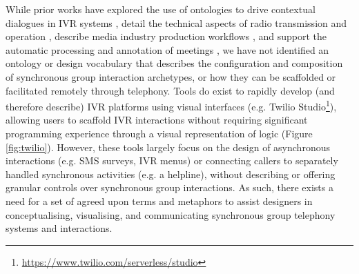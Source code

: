 While prior works have explored the use of ontologies to drive contextual dialogues in IVR systems \cite{ababneh2013, thirumaran2015, thirumaran2015a}, detail the technical aspects of radio transmission and operation \cite{ihmcIHMCOntology}, describe media industry production workflows \cite{movielabs2021}, and support the automatic processing and annotation of meetings \cite{niekrasz2006}, we have not identified an ontology or design vocabulary that describes the configuration and composition of synchronous group interaction archetypes, or how they can be scaffolded or facilitated remotely through telephony. Tools do exist to rapidly develop (and therefore describe) IVR platforms using visual interfaces (e.g. Twilio Studio\footnote{\url{https://www.twilio.com/serverless/studio}}), allowing users to scaffold IVR interactions without requiring significant programming experience through a visual representation of logic (Figure \ref{fig:twilio}). However, these tools largely focus on the design of asynchronous interactions (e.g. SMS surveys, IVR menus) or connecting callers to separately handled synchronous activities (e.g. a helpline), without describing or offering granular controls over synchronous group interactions. As such, there exists a need for a set of agreed upon terms and metaphors to assist designers in conceptualising, visualising, and communicating synchronous group telephony systems and interactions.